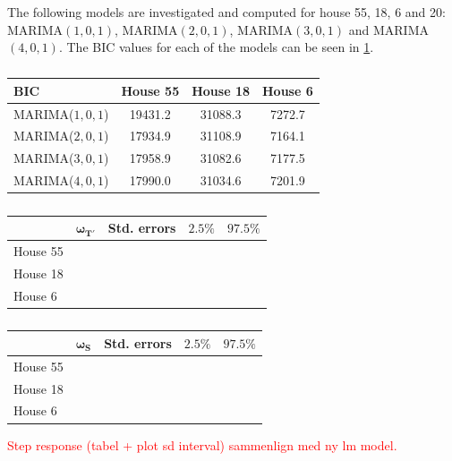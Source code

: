 \noindent The following models are investigated and computed for house 55, 18, 6 and 20: MARIMA$(1,0,1)$, MARIMA$(2,0,1)$, MARIMA$(3,0,1)$ and MARIMA$(4,0,1)$. The BIC values for each of the models can be seen in \cref{tab: BIC}.
\begin{table}[H]
    \centering
    \begin{tabular}{l|ccc}
    \hline
    \textbf{BIC} & House 55 & House 18 & House 6 \\ \hline \hline
    MARIMA($1,0,1$) & 19431.2 & 31088.3 & 7272.7  \\
    MARIMA($2,0,1$) & 17934.9 & 31108.9 & 7164.1  \\
    MARIMA($3,0,1$) & 17958.9 & 31082.6 & 7177.5  \\
    MARIMA($4,0,1$) & 17990.0 & 31034.6 & 7201.9  \\
    \hline
    \end{tabular}
    \caption{}
    \label{tab: BIC}
 \end{table}


\begin{table}[H]
    \centering
    \begin{tabular}{l|cccc}
    \hline
     & $\bm{\omega_{T'}}$ & \textbf{Std. errors} & $\bm{2.5\%}$ & $\bm{97.5\%}$ \\ \hline \hline
    House 55 & & & & \\
    House 18 & & & & \\
    House 6 & & & & \\
    \hline
    \end{tabular}
    \caption{}
    \label{tab: result_temp}
 \end{table}

 \begin{table}[H]
    \centering
    \begin{tabular}{l|cccc}
    \hline
     & $\bm{\omega_S}$ & \textbf{Std. errors} & $\bm{2.5\%}$ & $\bm{97.5\%}$ \\ \hline \hline
    House 55 & & & & \\
    House 18 & & & & \\
    House 6 & & & & \\
    \hline
    \end{tabular}
    \caption{}
    \label{tab: result_solar}
 \end{table}


\textcolor{red}{Step response (tabel + plot sd interval)
sammenlign med ny lm model.}
